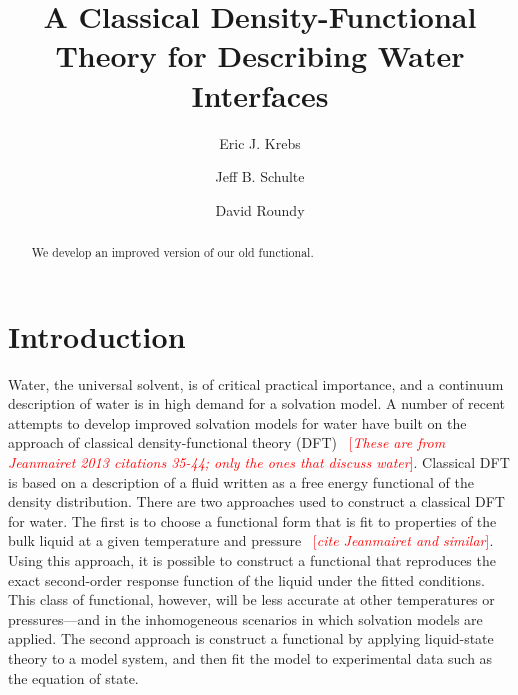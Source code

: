 \documentclass[twocolumn,amsmath,amssymb,prl]{revtex4-1}
\newcommand{\fixme}[1]{\textcolor{red}{[\emph{#1}]}}
\begin{document}
\title{A Classical Density-Functional Theory for Describing Water Interfaces}

\author{Eric J. Krebs}
\author{Jeff B. Schulte}
\author{David Roundy}

\begin{abstract}
We develop an improved version of our old functional.
\end{abstract}
\maketitle

\section{Introduction}

Water, the universal solvent, is of critical practical importance, and
a continuum description of water is in high demand for a solvation
model.  A number of recent attempts to develop improved solvation
models for water have built on the approach of classical
density-functional theory (DFT)\cite{jeanmairet2013molecular,
  zhao2011molecular, zhao2011new, ramirez2005direct,
  ramirez2005density, levesque2012solvation, levesque2012scalar}
~\fixme{These are from Jeanmairet 2013 citations 35-44; only the ones
  that discuss water}.  Classical DFT is based on a description of a fluid written
as a free energy functional of the density distribution.  There are
two approaches used to construct a classical DFT for water.  The first
is to choose a functional form that is fit to properties of the bulk
liquid at a given temperature and pressure
\cite{jeanmairet2013molecular} ~\fixme{cite Jeanmairet and similar}.
Using this approach, it is possible to construct a functional that
reproduces the exact second-order response function of the liquid
under the fitted conditions.  This class of functional, however, will
be less accurate at other temperatures or pressures---and in the
inhomogeneous scenarios in which solvation models are applied.  The
second approach is construct a functional by applying liquid-state
theory to a model system, and then fit the model to experimental data
such as the equation of state.
\end{document}
